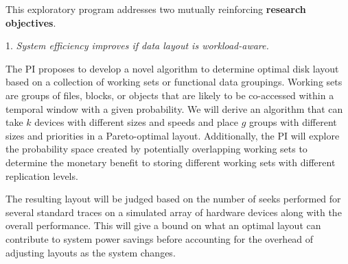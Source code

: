 This exploratory program addresses two mutually reinforcing \textbf{research objectives}.
\begin{myitemize}

\item[1.]
\emph{System efficiency improves if data layout is workload-aware.}

The PI proposes to develop a novel algorithm to determine optimal disk layout
based on a collection of working sets or functional data groupings.  Working
sets are groups of files, blocks, or objects that are likely to be co-accessed
within a temporal window with a given probability.  We will derive an algorithm
that can take $k$ devices with different sizes and speeds and place $g$ groups
with different sizes and priorities in a Pareto-optimal layout.  Additionally,
the PI will explore the probability space created by potentially overlapping
working sets to determine the monetary benefit to storing different working sets
with different replication levels.  


The resulting layout will be judged based on the number of seeks performed for
several standard traces on a simulated array of hardware devices along with the
overall performance.  This will give a bound on what an optimal layout can
contribute to system power savings before accounting for the overhead of
adjusting layouts as the system changes.





\end{myitemize}
